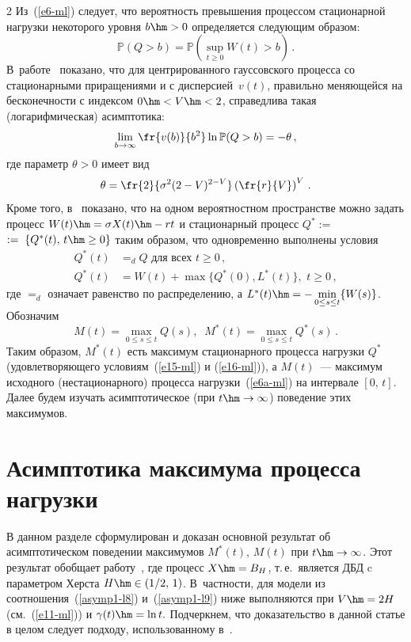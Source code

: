 \begin{multicols}{2}
Из~(\ref{e6-ml}) следует, что  вероятность превышения процессом
стационарной нагрузки некоторого  уровня  $b\hm>0$ определяется
следующим образом:
\begin{equation*}
\mathbb{P}( Q>b) = \mathbb{P}\left(\sup\limits_{t \geq 0}W(t)>b\right)\,.
\end{equation*}
В~работе~\cite{Duffy} показано, что для центрированного
гауссовского процесса со стационарными приращениями и с дисперсией~$v(t)$, 
правильно меняющейся на бесконечности  с индексом $0\hm<V\hm<2$,
справедлива такая (логарифмическая) асимптотика:
\begin{equation}
\lim\limits_{b \to \infty} \fr{v(b)}{b^2} \ln \mathbb{P}(Q>b)=-\theta\,,
\label{asymp1-l13}
\end{equation}
где параметр $\theta>0$ имеет   вид
\begin{equation}
\theta=\fr{2}{\sigma^2(2-V)^{2-V}}\left( \fr{r}{V}
\right)^V\,.
\label{e11-ml}
\end{equation}
Кроме того, в~\cite{Konstantopoulos} показано, что на одном
веро\-ят\-ностном пространстве можно задать процесс $W(t)\hm=\sigma X(t)\hm-rt$ и
стационарный процесс $Q^*:=$\linebreak $:=\;\{Q^*(t),\, t\hm \geq 0\}$ таким образом,
что одновременно выполнены условия
\begin{align}
Q^*(t)&=_d Q \mbox{ для всех } t \geq 0\,,\label{e15-ml}\\
Q^*(t)&=W(t)+\max\{Q^*(0), L^*(t)\},\,\, t \geq 0\,,\label{e16-ml}
\end{align}
где $=_d$ означает равенство по распределению, а $L^*(t)\hm=-\min\limits_{0\le s\le t}\{W(s)\}$. 
Обозначим
\begin{equation*}
M(t)=\max\limits_{0 \leq s \leq t}Q(s),\;\; M^*(t)=\max\limits_{0 \leq s \leq
t}Q^*(s)\,. 
\end{equation*}
Таким образом, $M^*(t)$  есть  максимум стационарного процесса
нагрузки $Q^*$ (удовлетворяющего условиям~(\ref{e15-ml}) и (\ref{e16-ml})), а
$M(t)$~--- максимум исходного (нестационарного) процесса нагрузки~(\ref{e6a-ml}) 
на интервале $[0,\,t]$. Далее будем изучать
асимптотическое (при $t\hm\to \infty$) поведение этих максимумов.

\section{Асимптотика  максимума процесса нагрузки}

В данном разделе сформулирован и доказан основной результат об
асимптотическом поведении  максимумов $M^*(t),\,M(t)$ при $t\hm\to \infty$. 
Этот результат   обобщает  работу~\cite{Zeevi}, где процесс
$X\hm=B_H$, т.\,е.\  является  ДБД  c параметром Херста  $H\hm\in (1/2,\,1)$. 
В~част\-ности, для модели из~\cite{Zeevi} соотношения~(\ref{asymp1-l8}) и~(\ref{asymp1-l9}) 
ниже  выполняются при $V\hm=2H$ (см.~(\ref{e11-ml})) и  $\gamma(t)\hm=\ln t.$
 Подчеркнем, что доказательство в данной статье в целом следует подходу,
использованному в~\cite{Zeevi}.


\end{multicols}
